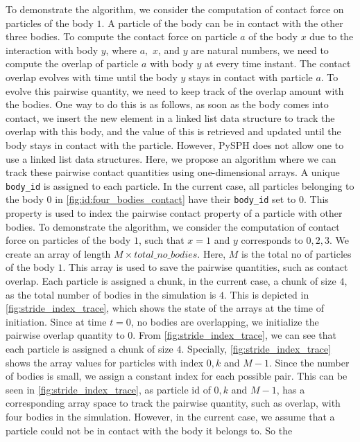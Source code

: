 To demonstrate the algorithm, we consider the computation of contact force on
particles of the body $1$. A particle of the body can be in contact with the
other three bodies. To compute the contact force on particle $a$ of the body $x$
due to the interaction with body $y$, where $a,$ $x$, and $y$ are natural
numbers, we need to compute the overlap of particle $a$ with body $y$ at every
time instant. The contact overlap evolves with time until the body $y$ stays in
contact with particle $a$. To evolve this pairwise quantity, we need to keep
track of the overlap amount with the bodies. One way to do this is as follows,
as soon as the body comes into contact, we insert the new element in a linked
list data structure to track the overlap with this body, and the value of this
is retrieved and updated until the body stays in contact with the particle.
However, PySPH does not allow one to use a linked list data structures. Here, we
propose an algorithm where we can track these pairwise contact quantities using
one-dimensional arrays. A unique \texttt{body\_id} is assigned to each particle. In the
current case, all particles belonging to the body $0$ in
\cref{fig:id:four_bodies_contact} have their \texttt{body\_id} set to $0$. This
property is used to index the pairwise contact property of a particle with other
bodies. To demonstrate the algorithm, we consider the computation of contact
force on particles of the body $1$, such that $x=1$ and $y$ corresponds to
$0, 2, 3$. We create an array of length $M \times total\_no\_bodies$. Here, $M$
is the total no of particles of the body $1$. This array is used to save the
pairwise quantities, such as contact overlap. Each particle is assigned a chunk,
in the current case, a chunk of size $4$, as the total number of bodies in the
simulation is $4$. This is depicted in \cref{fig:stride_index_trace}, which
shows the state of the arrays at the time of initiation. Since at time $t=0$, no
bodies are overlapping, we initialize the pairwise overlap quantity to $0$. From
\cref{fig:stride_index_trace}, we can see that each particle is assigned a chunk
of size $4$. Specially, \cref{fig:stride_index_trace} shows the array values for
particles with index $0, k$ and $M-1$. Since the number of bodies is small, we
assign a constant index for each possible pair. This can be seen in
\cref{fig:stride_index_trace}, as particle id of $0, k$ and $M-1$, has a
corresponding array space to track the pairwise quantity, such as overlap, with
four bodies in the simulation. However, in the current case, we assume that a
particle could not be in contact with the body it belongs to. So the
